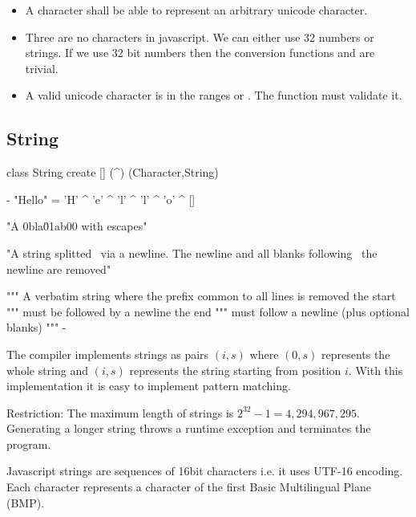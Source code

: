 \begin{itemize}

\item A character shall be able to represent an arbitrary unicode character.

\item Three are no characters in javascript. We can either use 32 numbers or
  strings. If we use 32 bit numbers then the conversion functions
   and  are trivial.

\item A valid unicode character is in the ranges  or
  . The function  must validate it.
\end{itemize}











\vskip 5mm
\subsection{String}

\begin{alba}
  class String create
    []
    (^) (Character,String)

  {-
    "Hello"   = 'H' ^ 'e' ^ 'l' ^ 'l' ^ 'o' ^ []

    "A \nstring \xa0bla\u{01ab00} with escapes"

    "A string splitted \
     via a newline. The newline and all blanks following \
     the newline are removed"

    """
       A verbatim
          string
       where the prefix
     common to all lines
       is removed
     the start """ must be followed by a newline
     the end """ must follow a newline (plus optional blanks)
    """
  -}
\end{alba}

The compiler implements strings as pairs $(i,s)$ where $(0,s)$ represents the
whole string and $(i,s)$ represents the string starting from position
$i$. With this implementation it is easy to implement pattern matching.

Restriction: The maximum length of strings is $2^{32} - 1 =
4,294,967,295$. Generating a longer string throws a runtime exception and
terminates the program.

Javascript strings are sequences of 16bit characters i.e. it uses UTF-16
encoding. Each character represents a character of the first Basic
Multilingual Plane (BMP).

